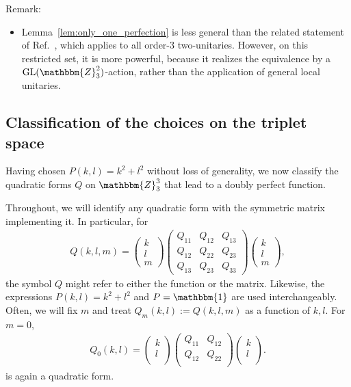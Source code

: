 \documentclass[aps,nofootinbib,floatfix,a4paper]{revtex4}
\newcommand{\1}{\mbox{$\mathbf{1}$}}
\def\ZZ{\mathbbm{Z}}
\def\Id{\mathbbm{1}}
\DeclareMathOperator{\GL}{GL}
\begin{document}
Remark:
\begin{itemize}
	\item
		Lemma~\ref{lem:only_one_perfection} is less general than the related statement of Ref.~\cite[Theorem~1]{Rather2023Absolutely}, which applies to all order-$3$ two-unitaries.
		However, on this restricted set, it is more powerful, because it realizes the equivalence 
		by a $\GL(\ZZ_3^2)$-action, rather than the application of general local unitaries.
\end{itemize}


\subsection{Classification of the choices on the triplet space}

Having chosen $P(k,l)=k^2+l^2$ without loss of generality,
we now classify the quadratic forms $Q$ on $\ZZ_3^3$ that lead to a doubly perfect function.

Throughout, we will identify any quadratic form with the symmetric matrix implementing it.
In particular, for
\begin{align*}
	Q(k,l,m)
	=
		\begin{pmatrix}
			k \\
			l \\
			m
		\end{pmatrix}
		\begin{pmatrix}
			Q_{11} & Q_{12} & Q_{13} \\
			Q_{12} & Q_{22} & Q_{23} \\
			Q_{13} & Q_{23} & Q_{33}
		\end{pmatrix}
		\begin{pmatrix}
			k \\
			l \\
			m
		\end{pmatrix},
\end{align*}
the symbol $Q$ might refer to either the function or the matrix.
Likewise, the expressions $P(k,l)=k^2+l^2$ and $P=\Id$ are used interchangeably.
Often, we will fix $m$ and treat $Q_m(k,l):=Q(k,l,m)$ as a function of $k,l$.
For $m=0$,
\begin{align*}
	Q_0(k,l)
	=
	\begin{pmatrix}
		k \\
		l \\
	\end{pmatrix}
	\begin{pmatrix}
		Q_{11} & Q_{12} \\
		Q_{12} & Q_{22} \\
	\end{pmatrix}
	\begin{pmatrix}
		k \\
		l \\
	\end{pmatrix}
	.
\end{align*}
is again a quadratic form. %
\end{document}
